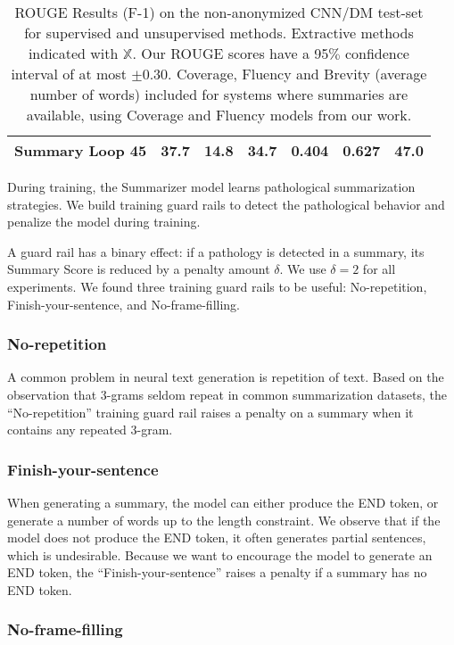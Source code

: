 \documentclass[11pt,a4paper]{article}
\begin{document}
\begin{table*}[]
{\begin{tabular}{llllccc}
         Summary Loop 45 & \textbf{37.7} & \textbf{14.8} & \textbf{34.7} & 0.404 & 0.627 & 47.0 \\ \hline
         \end{tabular}
    }
    \caption{ROUGE Results (F-1) on the non-anonymized CNN/DM test-set for supervised and unsupervised methods. Extractive methods indicated with $\mathds{X}$. Our ROUGE scores have a 95$\%$ confidence interval of at most $\pm$0.30. Coverage, Fluency and Brevity (average number of words) included for systems where summaries are available, using Coverage and Fluency models from our work.}
    \label{table:cnndm_rouge}
\end{table*}

During training, the Summarizer model learns pathological summarization strategies. We build training guard rails to detect the pathological behavior and penalize the model during training.

A guard rail has a binary effect: if a pathology is detected in a summary, its Summary Score is reduced by a penalty amount $\delta$. We use $\delta=2$ for all experiments. We found three training guard rails to be useful: No-repetition, Finish-your-sentence, and No-frame-filling.

\subsubsection{No-repetition}

A common problem in neural text generation is repetition of text. Based on the observation that 3-grams seldom repeat in common summarization datasets, the ``No-repetition'' training guard rail raises a penalty on a summary when it contains any repeated 3-gram.

\subsubsection{Finish-your-sentence}

When generating a summary, the model can either produce the END token, or generate a number of words up to the length constraint. We observe that if the model does not produce the END token, it often generates partial sentences, which is undesirable. Because we want to encourage the model to generate an END token, the ``Finish-your-sentence'' raises a penalty if a summary has no END token.

\subsubsection{No-frame-filling}
\end{document}
